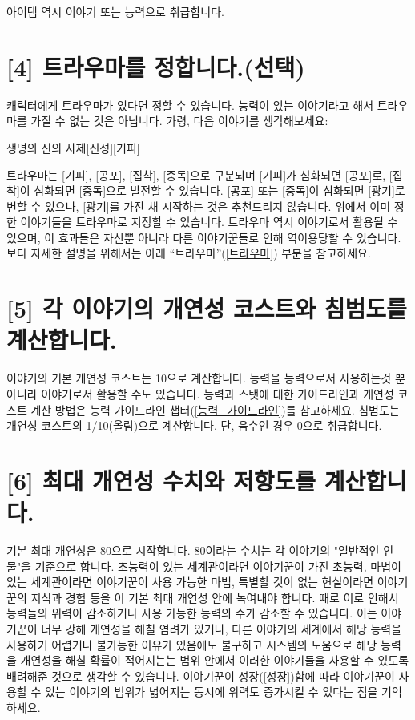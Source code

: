 \documentclass{report}
\begin{document}
	아이템 역시 이야기 또는 능력으로 취급합니다.
	
	\section*{[4] 트라우마를 정합니다.(선택)}
	캐릭터에게 트라우마가 있다면 정할 수 있습니다. 능력이 있는 이야기라고 해서 트라우마를 가질 수 없는 것은 아닙니다. 가령, 다음 이야기를 생각해보세요:
	
	\begin{story}{생명의 신의 사제}{[신성][기피]}
		
	\end{story}
	
	트라우마는 [기피], [공포], [집착], [중독]으로 구분되며 [기피]가 심화되면 [공포]로, [집착]이 심화되면 [중독]으로 발전할 수 있습니다. [공포] 또는 [중독]이 심화되면 [광기]로 변할 수 있으나, [광기]를 가진 채 시작하는 것은 추천드리지 않습니다. 위에서 이미 정한 이야기들을 트라우마로 지정할 수 있습니다. 트라우마 역시 이야기로서 활용될 수 있으며, 이 효과들은 자신뿐 아니라 다른 이야기꾼들로 인해 역이용당할 수 있습니다. 보다 자세한 설명을 위해서는 아래 “트라우마”(\ref{트라우마}) 부분을 참고하세요.
	
	\section*{[5] 각 이야기의 개연성 코스트와 침범도를 계산합니다.}
	
	이야기의 기본 개연성 코스트는 10으로 계산합니다.
	능력을 능력으로서 사용하는것 뿐 아니라 이야기로서 활용할 수도 있습니다.
	능력과 스탯에 대한 가이드라인과 개연성 코스트 계산 방법은 능력 가이드라인 챕터(\ref{능력_가이드라인})를 참고하세요. 침범도는 개연성 코스트의 1/10(올림)으로 계산합니다. 단, 음수인 경우 0으로 취급합니다.
	
	\section*{[6] 최대 개연성 수치와 저항도를 계산합니다.}
	기본 최대 개연성은 80으로 시작합니다. 80이라는 수치는 각 이야기의 "일반적인 인물"을 기준으로 합니다. 초능력이 있는 세계관이라면 이야기꾼이 가진 초능력, 마법이 있는 세계관이라면 이야기꾼이 사용 가능한 마법, 특별할 것이 없는 현실이라면 이야기꾼의 지식과 경험 등을 이 기본 최대 개연성 안에 녹여내야 합니다. 때로 이로 인해서 능력들의 위력이 감소하거나 사용 가능한 능력의 수가 감소할 수 있습니다. 이는 이야기꾼이 너무 강해 개연성을 해칠 염려가 있거나, 다른 이야기의 세계에서 해당 능력을 사용하기 어렵거나 불가능한 이유가 있음에도 불구하고 시스템의 도움으로 해당 능력을 개연성을 해칠 확률이 적어지는는 범위 안에서 이러한 이야기들을 사용할 수 있도록 배려해준 것으로 생각할 수 있습니다. 이야기꾼이 성장(\ref{성장})함에 따라 이야기꾼이 사용할 수 있는 이야기의 범위가 넓어지는 동시에 위력도 증가시킬 수 있다는 점을 기억하세요.
	
\end{document}
